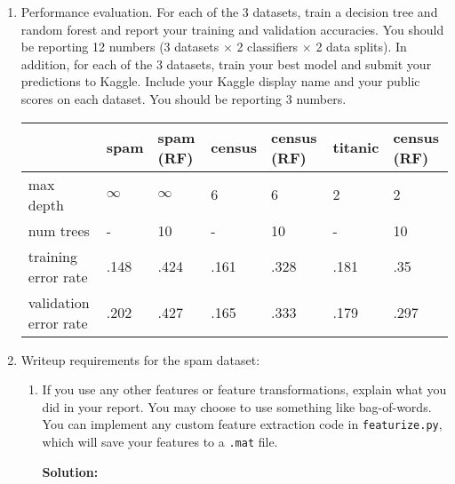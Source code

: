 \documentclass{article}
\newcommand{\solution}{\textbf{Solution: }}
\begin{document}
\begin{enumerate}
\begin{enumerate}
        \item How did you implement random forests?
        \begin{mdframed} \solution
        \end{mdframed}

        \item Anything else cool you implemented?
        \begin{mdframed} \solution
        \end{mdframed}
    \end{enumerate}

  \item Performance evaluation. For each of the 3 datasets, train a decision
    tree and random forest and report your training and validation
    accuracies. You should be reporting 12 numbers (3 datasets $\times$ 2
    classifiers $\times$ 2 data splits). In addition, for each of the 3
    datasets, train your best model and submit your predictions to
    Kaggle. Include your Kaggle display name and your public scores on each
    dataset. You should be reporting 3 numbers.
    \begin{mdframed}
      \begin{tabular}{l|l|l|l|l|l|l}
                              & spam     & spam (RF) & census & census (RF) & titanic & census (RF) \\
        \hline
        max depth             & $\infty$ & $\infty$  & 6      & 6           & 2       & 2    \\
        num trees             & -        & 10        & -      & 10          & -       & 10   \\
        training error rate   & .148     & .424      & .161   & .328        & .181    & .35  \\
        validation error rate & .202     & .427      & .165   & .333        & .179    & .297 \\
      \end{tabular}
    \end{mdframed}

    \item Writeup requirements for the spam dataset:
    \begin{enumerate}
        \item If you use any other features or feature transformations, explain what you did in your report. You may choose to use something like bag-of-words. You can implement any custom feature extraction code in \texttt{featurize.py}, which will save your features to a \texttt{.mat} file.
        \begin{mdframed}\solution
        \end{mdframed}


\end{enumerate}
\end{enumerate}
\end{document}
